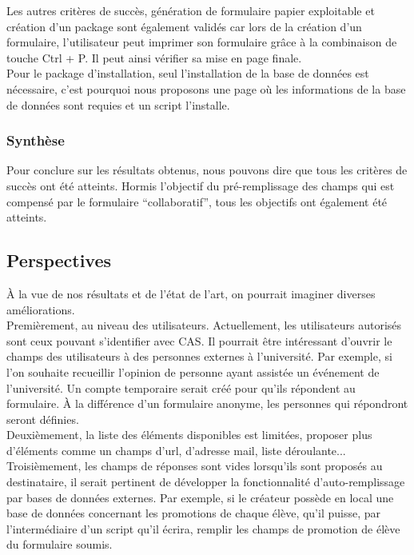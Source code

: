 \documentclass{sigplanconf}
\begin{document}
Les autres critères de succès, génération de formulaire papier exploitable et création d’un package sont également validés car lors de la création d’un formulaire, l’utilisateur peut imprimer son formulaire grâce à la combinaison de touche Ctrl + P. Il peut ainsi vérifier sa mise en page finale.\\
Pour le package d’installation, seul l'installation de la base de données est nécessaire, c'est pourquoi nous proposons une page où les informations de la base de données sont requies et un script l'installe.

\subsubsection{Synthèse}
Pour conclure sur les résultats obtenus, nous pouvons dire que tous les critères de succès ont été atteints. Hormis l’objectif du pré-remplissage des champs qui est compensé par le formulaire “collaboratif”, tous les objectifs ont également été atteints.

\subsection{Perspectives}
À la vue de nos résultats et de l’état de l’art, on pourrait imaginer diverses améliorations.\\
Premièrement, au niveau des utilisateurs. Actuellement, les utilisateurs autorisés sont ceux pouvant s’identifier avec CAS. Il pourrait être intéressant d’ouvrir le champs des utilisateurs à des personnes externes à l’université. Par exemple, si l’on souhaite recueillir l'opinion de personne ayant assistée un événement de l’université. Un compte temporaire serait créé pour qu’ils répondent au formulaire. À la différence d’un formulaire anonyme, les personnes qui répondront seront définies.\\
Deuxièmement, la liste des éléments disponibles est limitées, proposer plus d’éléments comme un champs d’url, d'adresse mail, liste déroulante... \\
Troisièmement, les champs de réponses sont vides lorsqu’ils sont proposés au destinataire, il serait pertinent de développer la fonctionnalité d’auto-remplissage par bases de données externes. Par exemple, si le créateur possède en local une base de données concernant les promotions de chaque élève, qu’il puisse, par l’intermédiaire d’un script qu’il écrira, remplir les champs de promotion de élève du formulaire soumis.
\end{document}
